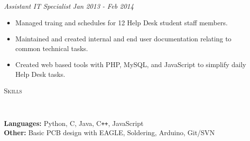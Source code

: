 \documentclass{article}
\newenvironment{changemargin}[2]{%
  \begin{list}{}{%
    \setlength{\topsep}{0pt}%
    \setlength{\leftmargin}{#1}%
    \setlength{\rightmargin}{#2}%
    \setlength{\listparindent}{\parindent}%
    \setlength{\itemindent}{\parindent}%
    \setlength{\parsep}{\parskip}%
  }%
  \item[]}{\end{list}
}
\newcommand{\lineover}{
	\begin{changemargin}{-0.05in}{-0.05in}
		\vspace*{-8pt}
		\hrulefill \\
		\vspace*{-2pt}
	\end{changemargin}
}
\newcommand{\header}[1]{
	\begin{changemargin}{-0.5in}{-0.5in}
		\scshape{#1}\\
  	\lineover
	\end{changemargin}
}
\newenvironment{body} {
	\vspace*{-16pt}
	\begin{changemargin}{-0.25in}{-0.5in}
  }	
	{\end{changemargin}
}
\begin{document}
\begin{body}


	\emph{Assistant IT Specialist} \hfill \emph{Jan 2013 - Feb 2014}\\
	\begin{itemize} \itemsep -0pt  %
		\item Managed traing and schedules for 12 Help Desk student staff members.
		\item Maintained and created internal and end user documentation relating to common technical tasks.
		\item Created web based tools with PHP, MySQL, and JavaScript to simplify daily Help Desk tasks.
	\end{itemize}

\end{body}

\smallskip

\header{Skills}

\begin{body}
	\vspace{14pt}
	\textbf{Languages:}{} Python, C, Java, C{}\verb!++!, JavaScript\\%
	\textbf{Other:}{} Basic PCB design with EAGLE, Soldering, Arduino, Git/SVN\\
\end{body}

\smallskip

\end{document}
